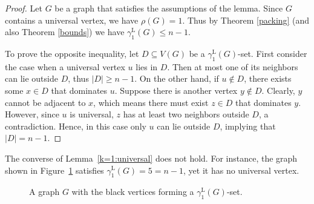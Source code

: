\documentclass[11pt]{article}
\newcommand{\gammaenaL}{\gamma_1^{\mathrm L}}
\begin{document}
\begin{proof}
Let $G$ be a graph that satisfies the assumptions of the lemma. Since $G$ contains a universal vertex, we have $\rho(G)=1$. Thus by Theorem \ref{packing} (and also Theorem \ref{bounds}) we have $\gammaenaL(G)\leq n-1$.

To prove the opposite inequality, let $D \subseteq V(G)$ be a $\gammaenaL(G)$-set. 
First consider the case when a universal vertex $u$ lies in $D$. Then at most one of its neighbors can lie outside $D$, thus $|D| \geq n-1$. On the other hand, if $u \notin D$, there exists some $x \in D$ that dominates $u$. Suppose there is another vertex $y \notin D$. Clearly, $y$ cannot be adjacent to $x$, which means there must exist $z \in D$ that dominates $y$. However, since $u$ is universal, $z$ has at least two neighbors outside $D$, a contradiction. Hence, in this case only $u$ can lie outside $D$, implying that $|D| = n-1$.
\end{proof}





The converse of Lemma~\ref{k=1:universal} does not hold. For instance, the graph shown in Figure~\ref{S2} satisfies $\gamma_1^{\mathrm L}(G)=5=n-1$, yet it has no universal vertex.



\begin{figure}[H]
\begin{center}
\end{center}
\caption{A graph $G$ with the black vertices forming a $\gammaenaL(G)$-set.}
\label{S2}
\end{figure}
\end{document}
